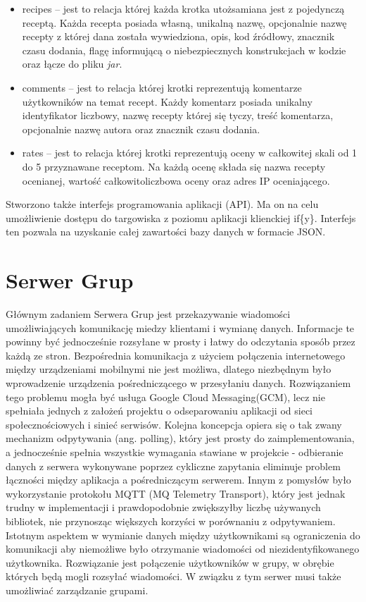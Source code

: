 \documentclass[11pt,a4paper,polish,thesis]{dcsbook}
\begin{document}
\begin{itemize}
\item recipes -- jest to relacja której każda krotka utożsamiana jest z pojedynczą receptą. Każda recepta posiada własną, unikalną nazwę, opcjonalnie nazwę recepty
z której dana została wywiedziona, opis, kod źródłowy, znacznik czasu dodania, flagę informującą o niebezpiecznych konstrukcjach w kodzie oraz łącze do pliku
\emph{jar}.
\item comments -- jest to relacja której krotki reprezentują komentarze użytkowników na temat recept. Każdy komentarz posiada unikalny identyfikator liczbowy, nazwę
recepty której się tyczy, treść komentarza, opcjonalnie nazwę autora oraz znacznik czasu dodania.
\item rates -- jest to relacja której krotki reprezentują oceny w całkowitej skali od 1 do 5 przyznawane receptom. Na każdą ocenę składa się nazwa recepty ocenianej,
wartość całkowitoliczbowa oceny oraz adres IP oceniającego.
\end{itemize}
Stworzono także interfejs programowania aplikacji (API). Ma on na celu umożliwienie dostępu do targowiska z poziomu aplikacji klienckiej if\{y\}. Interfejs ten
pozwala na uzyskanie całej zawartości bazy danych w formacie JSON.
\section{Serwer Grup}
Głównym zadaniem Serwera Grup jest przekazywanie wiadomości umożliwiających komunikację miedzy klientami i wymianę danych. 
Informacje te powinny być jednocześnie rozsyłane w prosty i łatwy do odczytania sposób przez każdą ze stron.
Bezpośrednia komunikacja z użyciem połączenia internetowego między urządzeniami mobilnymi nie jest możliwa, dlatego niezbędnym było wprowadzenie urządzenia pośredniczącego w przesyłaniu danych. 
Rozwiązaniem tego problemu mogła być usługa Google Cloud Messaging(GCM), lecz nie spełniała jednych z założeń projektu o odseparowaniu aplikacji od sieci społecznościowych i sinieć serwisów.
Kolejna koncepcja opiera się o tak zwany mechanizm odpytywania (ang. polling), który jest prosty do zaimplementowania, a jednocześnie spełnia wszystkie wymagania stawiane w projekcie - odbieranie danych z serwera wykonywane poprzez cykliczne zapytania eliminuje problem łączności między aplikacja a pośredniczącym serwerem.
Innym z pomysłów było wykorzystanie protokołu MQTT (MQ Telemetry Transport), który jest jednak trudny w implementacji i prawdopodobnie zwiększyłby liczbę używanych bibliotek, nie przynosząc większych korzyści w porównaniu z odpytywaniem.
Istotnym aspektem w wymianie danych między użytkownikami są ograniczenia do komunikacji aby niemożliwe było otrzymanie wiadomości od niezidentyfikowanego użytkownika.
Rozwiązanie jest połączenie użytkowników w grupy, w obrębie których będą mogli rozsyłać wiadomości. W związku z tym serwer musi także umożliwiać zarządzanie grupami.
\end{document}
